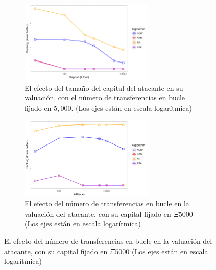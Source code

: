 \begin{figure}[htbp]
	\centering
	\begin{subfigure}{\linewidth}
		\centering
		\includegraphics[width=0.7\textwidth]{figs/AttackDeposit.pdf}
		\caption{El efecto del tamaño del capital del atacante en su valuación, con el número de transferencias en bucle fijado en $5,000$. \small{(Los ejes están en escala logarítmica)}}
		\label{subfig:deposit}
	\end{subfigure}

	\begin{subfigure}{\linewidth}
	    \centering
		\includegraphics[width=0.7\textwidth]{figs/AttackTimes.pdf}
		\caption{El efecto del número de transferencias en bucle en la valuación del atacante, con su capital fijado en $\Xi5000$ \small{(Los ejes están en escala logarítmica)}}\label{subfig:times}
	\end{subfigure}


\end{figure}
